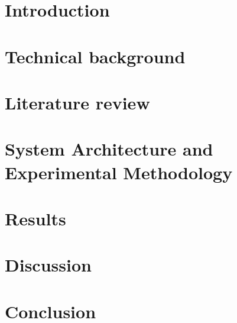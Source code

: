 \section{Introduction}
\label{sec:introduction}

\thispagestyle{empty}



\clearpage

\section{Technical background}




\label{sec:technical_bg}


\clearpage

\section{Literature review}
\label{sec:literature-review}



\clearpage

\section{System Architecture and Experimental Methodology}
\label{sec:methods}


\clearpage

\section{Results}
\label{sec:results}


\clearpage

\section{Discussion}
\label{sec:discussion}


\clearpage

\section{Conclusion}
\label{sec:conclusion}


